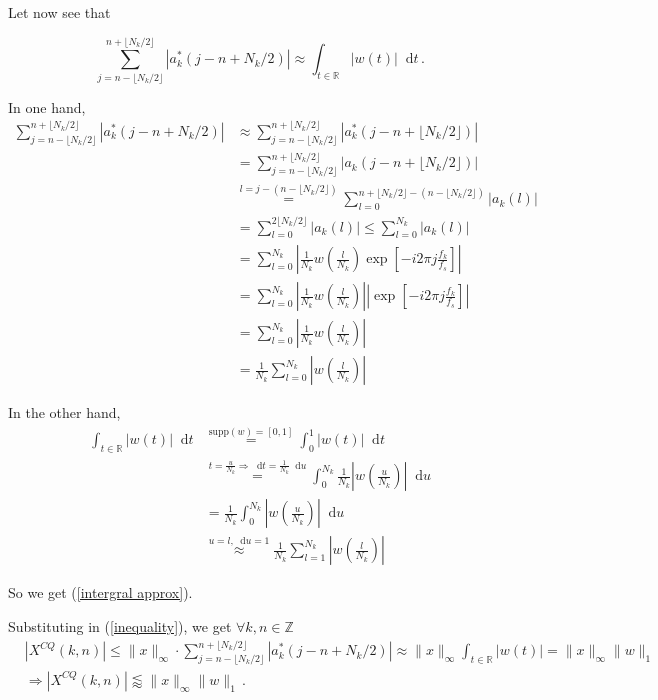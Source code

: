 \documentclass[12pt]{article}
\newcommand*\diff{\mathop{}\!\mathrm{d}}
\begin{document}
Let now see that

\begin{equation}\label{intergral approx}
\sum_{j=n-\lfloor N_k / 2 \rfloor}^{n+\lfloor N_k / 2 \rfloor} |a_k^{*}(j-n+N_k/2) | \approx \int_{t\in \mathbb{R}} |w(t)| \diff t \, .
\end{equation}

In one hand, 
\begin{align*}
\sum_{j=n-\lfloor N_k / 2 \rfloor}^{n+\lfloor N_k / 2 \rfloor} |a_k^{*}(j-n+N_k/2) | &\approx \sum_{j=n-\lfloor N_k / 2 \rfloor}^{n+\lfloor N_k / 2 \rfloor} |a_k^{*}(j-n+\lfloor N_k / 2 \rfloor) | \\
&= \sum_{j=n-\lfloor N_k / 2 \rfloor}^{n+\lfloor N_k / 2 \rfloor} |a_k(j-n+\lfloor N_k / 2 \rfloor) | \\
&\overset{l=j-(n-\lfloor N_k / 2 \rfloor)}{=} \sum_{l=0}^{n+\lfloor N_k / 2 \rfloor - (n-\lfloor N_k / 2 \rfloor)} |a_k(l) | \\
&= \sum_{l=0}^{2 \lfloor N_k / 2 \rfloor } |a_k(l) | \leq \sum_{l=0}^{N_k } |a_k(l) | \\
&= \sum_{l=0}^{N_k } \left| \frac{1}{N_k} w(\frac{l}{N_k})\exp\left[- i 2 \pi j \frac{f_k}{f_s}\right] \right| \\
&= \sum_{l=0}^{N_k } \left| \frac{1}{N_k} w(\frac{l}{N_k}) \right| \left| \exp\left[- i 2 \pi j \frac{f_k}{f_s}\right] \right| \\
&= \sum_{l=0}^{N_k } \left| \frac{1}{N_k} w(\frac{l}{N_k})\right| \\
&= \frac{1}{N_k} \sum_{l=0}^{N_k } \left| w(\frac{l}{N_k})\right|
\end{align*}

In the other hand,
\begin{align*}
\int_{t\in \mathbb{R}} |w(t)| \diff t &\overset{\text{supp} (w) = [0,1]}{=}  \int_{0}^{1} |w(t)| \diff t \\
&\overset{t = \frac{u}{N_k} \Rightarrow \diff t = \frac{1}{N_k}\diff u}{=} \int_{0}^{N_k} \frac{1}{N_k} | w(\frac{u}{N_k})| \diff u \\
&= \frac{1}{N_k} \int_{0}^{N_k} | w(\frac{u}{N_k})| \diff u \\
&\overset{u=l, \diff u = 1}{\approx} \frac{1}{N_k} \sum_{l=1}^{N_k} | w(\frac{l}{N_k})| 
\end{align*}

So we get (\ref{intergral approx}).

Substituting in (\ref{inequality}), we get $\forall k,n \in \mathbb{Z}$
\begin{align*}
&|X^{CQ}(k,n)| \leq \| x \|_{\infty} \cdot \sum_{j=n-\lfloor N_k / 2 \rfloor}^{n+\lfloor N_k / 2 \rfloor} |a_k^{*}(j-n+N_k/2) | \approx \| x \|_{\infty}  \int_{t\in \mathbb{R}} |w(t)| = \| x \|_{\infty} \| w \|_1 \\
&\Rightarrow |X^{CQ}(k,n)| \lessapprox \| x \|_{\infty} \| w \|_1 \, .
\end{align*}
\end{document}
